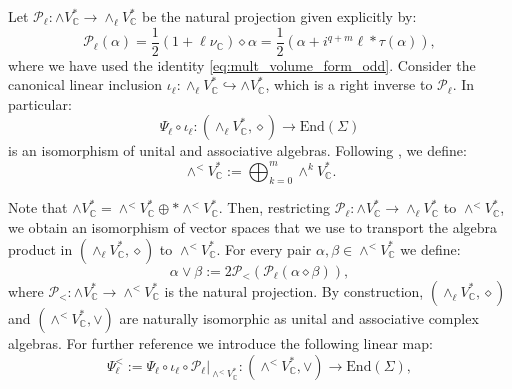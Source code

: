 \documentclass[10pt,a4paper,twoside,reqno]{amsart}
\theoremstyle{plain}
\theoremstyle{definition}
\theoremstyle{remark}
\newcommand{\End}{\mathrm{End}}
\def\C{\mathbb{C}}
\def\cP{\mathcal{P}}
\def\cP{\mathcal{P}}
\begin{document}
\noindent
Let $\cP_\ell\colon\wedge V^*_\C\to\wedge_\ell V^*_\C$ be the natural projection given explicitly by: \begin{equation}\label{eq:projection_l}
    \cP_\ell(\alpha)=\frac{1}{2}(1+\ell\nu_\C)\diamond\alpha=\frac{1}{2}(\alpha+i^{q+m}\ell*\tau(\alpha)),
\end{equation} where we have used the identity \eqref{eq:mult_volume_form_odd}. Consider the canonical linear inclusion $\iota_\ell\colon\wedge_\ell V_\C^*\hookrightarrow\wedge V_\C^*$, which is a right inverse to $\cP_\ell$. In particular: \begin{equation*}
    \Psi_\ell\circ\iota_\ell\colon(\wedge_\ell V^*_\C,\diamond)\to\End(\Sigma)
\end{equation*} is an isomorphism of unital and associative algebras. Following \cite{LBC13,LB13,LBC16}, we define: \begin{equation}\label{eq:vee_product}
    \wedge^<V^*_\C:=\bigoplus_{k=0}^m\wedge^kV^*_\C.
\end{equation}

Note that $\wedge V^*_\C=\wedge^<V_\C^*\oplus*\wedge^<V^*_\C$. Then, restricting $\cP_\ell\colon\wedge V^*_\C\to\wedge_\ell V^*_\C$ to $\wedge^<V^*_\C$, we obtain an isomorphism of vector spaces that we use to transport the algebra product in $(\wedge_\ell V^*_\C,\diamond)$ to $\wedge^<V^*_\C$. For every pair $\alpha,\beta\in\wedge^<V^*_\C$ we define:
\begin{equation*}
    \alpha\vee\beta:=2\cP_<(\cP_\ell(\alpha\diamond\beta)),
\end{equation*} where $\cP_<\colon\wedge V^*_\C\to\wedge^<V^*_\C$ is the natural projection. By construction, $(\wedge_\ell V^*_\C,\diamond)$ and $(\wedge^<V^*_\C,\vee)$ are naturally isomorphic as unital and associative complex algebras. For further reference we introduce the following linear map: 
\begin{equation}\label{eq:truncated_iso}
\Psi^<_\ell:=\Psi_\ell\circ\iota_\ell\circ\cP_\ell\vert_{\wedge^<V^*_\C}\colon(\wedge^<V^*_\C,\vee)\to\End(\Sigma),
\end{equation} 
\end{document}
